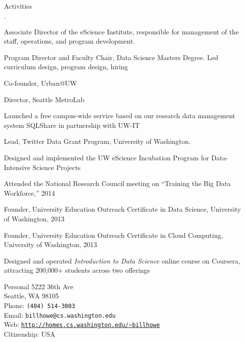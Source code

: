 \documentclass[10pt]{article}
\makeatletter
\newcommand{\phone}{{\tt (404) 514-3003}}
\newcommand{\email}{{\tt billhowe@cs.washington.edu}}
\newcommand{\www}{{\tt \url{http://homes.cs.washington.edu/~billhowe}}}
\newcommand{\address}{5222 36th Ave \\
Seattle, WA  98105}
\newenvironment{bulletlist}
   {
      \begin{list}
         {$\cdot$}
         {
            \setlength{\itemsep}{.5ex}
            \setlength{\parsep}{0ex}
            \setlength{\leftmargin}{0.7em}
            \setlength{\parskip}{0ex}
            \setlength{\topsep}{0ex}
         }
   }
   {
      \end{list}
   }
\newcommand{\marginlabel}[1]{
\begin{minipage}[b]{0.8\labelwidth}{\large \textsf{\textbf{#1}}}\end{minipage}}
\newcommand{\entrylabel}[1]{\mbox{\marginlabel{#1}}\hfill}
\newcommand{\MainListlabel}[1]
   {
      \parbox[t]{\labelwidth}{\hspace{.8em}\marginlabel{#1}}
   }
\newenvironment{MainList}[1]
   {
      \renewcommand{\entrylabel}{\MainListlabel}
      \begin{list}{}
      {
         \renewcommand{\makelabel}{\entrylabel}
         \setlength   {\itemindent}{-.65em}
         \setlength   {\labelwidth}{#1}
         \setlength   {\leftmargin}{\labelwidth}
         \setlength   {\itemsep}{3ex}
      }
   }
   {
      \end{list}
   }
\makeatother
\begin{document}
\begin{MainList}{88pt}
\item [Activities]
\begin{bulletlist}
\item Associate Director of the eScience Institute, responsible for management of the staff, operations, and program development.
\item Program Director and Faculty Chair, Data Science Masters Degree.  Led curriculum design, program design, hiring
\item Co-founder, Urban@UW
\item Director, Seattle MetroLab
\item Launched a free campus-wide service based on our research data management system SQLShare in partnership with UW-IT
\item Lead, Twitter Data Grant Program, University of Washington.
\item Designed and implemented the UW eScience Incubation Program for Data-Intensive Science Projects
\item Attended the National Research Council meeting on ``Training the Big Data Workforce,'' 2014
\item Founder, University Education Outreach Certificate in Data Science, University of Washington, 2013
\item Founder, University Education Outreach Certificate in Cloud Computing, University of Washington, 2013
\item Designed and operated {\em Introduction to Data Science} online course on Coursera, attracting 200,000+ students across two offerings
\end{bulletlist}



\item [Personal]
\address{}\\\newline
Phone: \phone\\
Email: \email\\
Web: \www \\
Citizenship: USA\\




\end{MainList}
\end{document}
